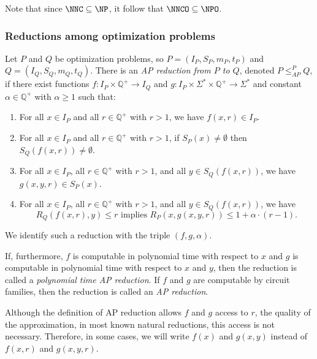 \documentclass[]{article}
\newcommand{\APr}{\leq_{AP}^{P}}
\begin{document}
Note that since $\NNC \subseteq \NP$, it follow that $\NNCO \subseteq \NPO$.

\subsubsection{Reductions among optimization problems}

\begin{definition}
  Let $P$ and $Q$ be optimization problems, so $P = (I_P, S_P, m_P, t_P)$ and $Q = (I_Q, S_Q, m_Q, t_Q)$.
  There is an \emph{AP reduction from $P$ to $Q$}, denoted $P \APr Q$, if there exist functions $f \colon I_P \times \mathbb{Q}^+ \to I_Q$ and $g \colon I_P \times \Sigma^* \times \mathbb{Q}^+ \to \Sigma^*$ and constant $\alpha \in \mathbb{Q}^+$ with $\alpha \geq 1$ such that:
  \begin{enumerate}
  \item For all $x \in I_P$ and all $r \in \mathbb{Q}^+$ with $r > 1$, we have $f(x, r) \in I_P$.
  \item For all $x \in I_P$ and all $r \in \mathbb{Q}^+$ with $r > 1$, if $S_P(x) \neq \emptyset$ then $S_Q(f(x, r)) \neq \emptyset$.
  \item For all $x \in I_P$, all $r \in \mathbb{Q}^+$ with $r > 1$, and all $y \in S_Q(f(x, r))$, we have $g(x, y, r) \in S_P(x)$.
  \item For all $x \in I_P$, all $r \in \mathbb{Q}^+$ with $r > 1$, and all $y \in S_Q(f(x, r))$, we have
    \begin{equation*}
      R_Q(f(x, r), y) \leq r \text{ implies } R_P(x, g(x, y, r)) \leq 1 + \alpha \cdot (r - 1).
    \end{equation*}
  \end{enumerate}
  We identify such a reduction with the triple $(f, g, \alpha)$.

  If, furthermore, $f$ is computable in polynomial time with respect to $x$ and $g$ is computable in polynomial time with respect to $x$ and $y$, then the reduction is called a \emph{polynomial time AP reduction}.
  If $f$ and $g$ are computable by \FNC{} circuit families, then the reduction is called an \emph{\NC{} AP reduction}.
\end{definition}

Although the definition of AP reduction allows $f$ and $g$ access to $r$, the quality of the approximation, in most known natural reductions, this access is not necessary.
Therefore, in some cases, we will write $f(x)$ and $g(x, y)$ instead of $f(x, r)$ and $g(x, y, r)$.
\end{document}
